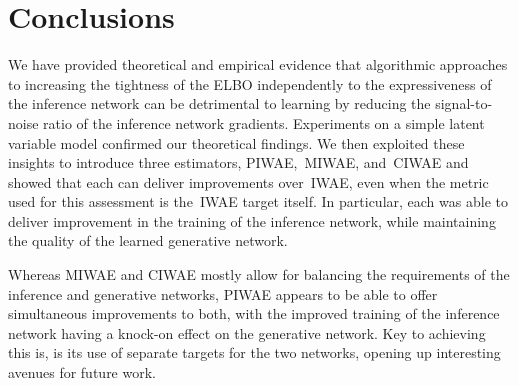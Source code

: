 
\section{Conclusions}
We have provided theoretical and empirical evidence that algorithmic approaches to increasing the tightness of the \gls{ELBO} independently to the expressiveness of the inference network can be detrimental to learning by reducing the
signal-to-noise ratio of the inference network gradients.
Experiments on a simple latent variable model confirmed our theoretical findings.
We then exploited these insights to introduce three estimators,
\gls{PIWAE},~\gls{MIWAE}, and~\gls{CIWAE} and showed that each
can deliver improvements over~\gls{IWAE}, even when the metric
used for this assessment is the~\gls{IWAE} target itself.  In particular, 
each was able to deliver improvement in the training of the inference network,
while maintaining the quality of the learned generative network.

Whereas \gls{MIWAE} and \gls{CIWAE} mostly allow for balancing the requirements of
the inference and generative networks, \gls{PIWAE} appears to be able to offer
simultaneous improvements to both, with the improved training of the inference network
having a knock-on effect on the generative network.  Key to achieving this is, is its use
of separate targets for the two networks, opening up interesting avenues for
future work.
%
%

%
